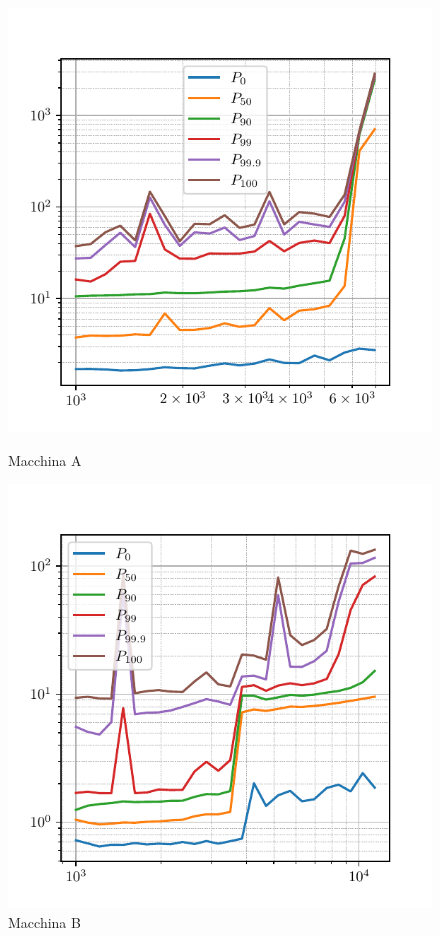 \begin{figure}[htbp]
    \centering
    \begin{minipage}[t]{0.48\textwidth}
        \centering
        \includegraphics[width=\textwidth]{03-risultati/bench-set-a}
        \caption*{Macchina A}
    \end{minipage}
    \hfill
    \begin{minipage}[t]{0.48\textwidth}
        \centering
        \includegraphics[width=\textwidth]{03-risultati/bench-set-c}
        \caption*{Macchina B}
    \end{minipage}


\end{figure}
